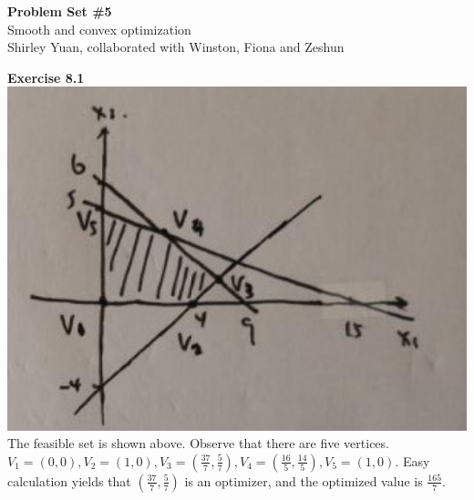 \documentclass[letterpaper,12pt]{article}
\theoremstyle{definition}
\begin{document}
\begin{flushleft}
  \textbf{\large{Problem Set \#5}} \\
  Smooth and convex optimization \\
  Shirley Yuan, collaborated with Winston, Fiona and Zeshun
\end{flushleft}


\noindent\textbf{Exercise 8.1}\\
\includegraphics{11.png}\\

The feasible set is shown above. Observe that there are five vertices. $V_1 = (0,0), V_2 = (1,0), V_3 = (\frac{37}{7}, \frac{5}{7}), V_4 = (\frac{16}{5}, \frac{14}{5}), V_5 = (1,0).$ Easy calculation yields that $(\frac{37}{7}, \frac{5}{7})$ is an optimizer, and the optimized value is $\frac{165}{7}.$ \\
\end{document}
